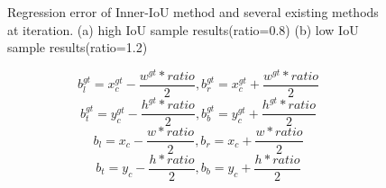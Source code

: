 \documentclass[lettersize,journal]{IEEEtran}
\begin{document}
		\begin{figure*}[!htbp]
		\hspace{2cm}
		\caption{Regression error of Inner-IoU method and several existing methods at iteration. 
		(a) high IoU sample results(ratio=0.8) (b) low IoU sample results(ratio=1.2)}
		\label{fig_4}
	\end{figure*}
	\begin{equation}
		b_{l}^{gt}=x_{c}^{gt}-\frac{w^{gt}*ratio}{2},b_{r}^{gt}=x_{c}^{gt}+\frac{w^{gt}*ratio}{2}
	\end{equation}
	\begin{equation}
		b_{t}^{gt}=y_{c}^{gt}-\frac{h^{gt}*ratio}{2},b_{b}^{gt}=y_{c}^{gt}+\frac{h^{gt}*ratio}{2}
	\end{equation}
	\begin{equation}
		b_{l}=x_{c}-\frac{w*ratio}{2},b_{r}=x_{c}+\frac{w*ratio}{2}
	\end{equation}
	\begin{equation}
		b_{t}=y_{c}-\frac{h*ratio}{2},b_{b}=y_{c}+\frac{h*ratio}{2}
	\end{equation}
	
\end{document}
